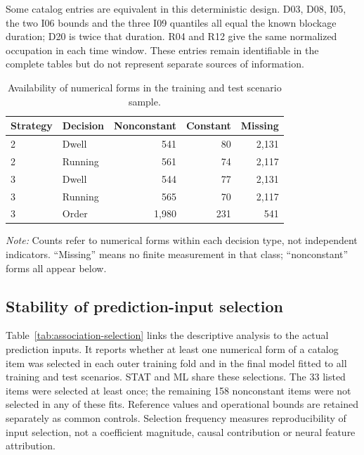 Some catalog entries are equivalent in this deterministic design. D03, D08, I05, the two I06 bounds and the three I09 quantiles all equal the known blockage duration; D20 is twice that duration. R04 and R12 give the same normalized occupation in each time window. These entries remain identifiable in the complete tables but do not represent separate sources of information.

\begin{table}[htbp]\centering\small

\caption{Availability of numerical forms in the training and test scenario sample.}

\begin{tabular}{@{}llrrr@{}}\toprule Strategy & Decision & Nonconstant & Constant & Missing \\ \midrule

2 & Dwell & 541 & 80 & 2,131 \\

2 & Running & 561 & 74 & 2,117 \\

3 & Dwell & 544 & 77 & 2,131 \\

3 & Running & 565 & 70 & 2,117 \\

3 & Order & 1,980 & 231 & 541 \\

\bottomrule\end{tabular}

\par\smallskip\begin{minipage}{0.96\linewidth}\footnotesize\textit{Note:} Counts refer to numerical forms within each decision type, not independent indicators. ``Missing'' means no finite measurement in that class; ``nonconstant'' forms all appear below.\end{minipage}

\end{table}

\subsection{Stability of prediction-input selection}

Table~\ref{tab:association-selection} links the descriptive analysis to the actual prediction inputs. It reports whether at least one numerical form of a catalog item was selected in each outer training fold and in the final model fitted to all training and test scenarios. STAT and ML share these selections. The 33 listed items were selected at least once; the remaining 158 nonconstant items were not selected in any of these fits. Reference values and operational bounds are retained separately as common controls. Selection frequency measures reproducibility of input selection, not a coefficient magnitude, causal contribution or neural feature attribution.

